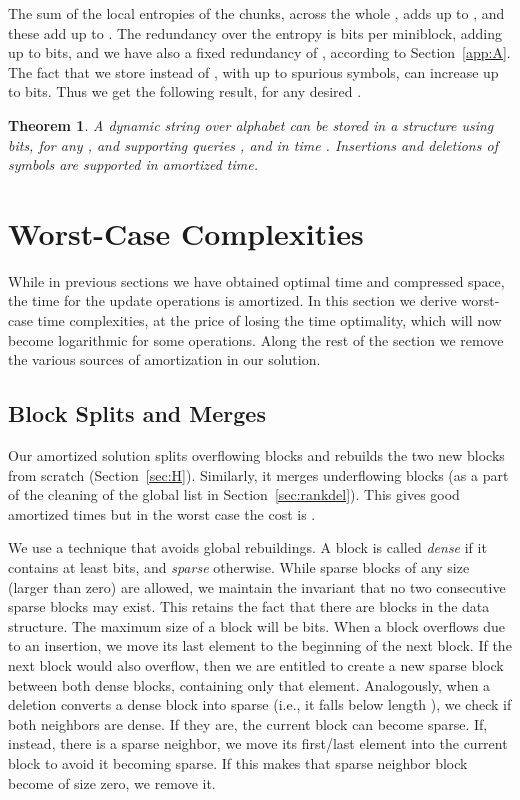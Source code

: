 \documentclass[11pt]{article}
\newtheorem{theorem}{Theorem}
\begin{document}
The sum of the local entropies of the chunks, across the whole 
, adds up to , and these add up to  \cite{GGV03}.
The redundancy over the entropy is  bits per
miniblock, adding up to  bits, and
we have also a fixed redundancy of , according to
Section~\ref{app:A}.
The fact that we store  instead of , with up to  spurious
symbols, can increase  up to  bits.
Thus we get the following result, for any desired .

\begin{theorem}
\label{thm:compr}
A dynamic string  over alphabet  
can be stored in a structure using 
 bits,
for any ,
and supporting queries
,  and  in time .
Insertions and deletions of symbols 
are supported in  amortized time. 
\end{theorem}

\section{Worst-Case Complexities} \label{sec:worst}

While in previous sections we have obtained optimal time and compressed space,
the time for the update operations is amortized. In this section we derive
worst-case time complexities, at the price of losing the time optimality,
which will now become logarithmic for some operations. 
Along the rest of the section we remove the various sources of amortization 
in our solution.

\subsection{Block Splits and Merges} \label{sec:indels}

Our amortized solution splits overflowing blocks and rebuilds the two new
blocks from scratch (Section~\ref{sec:H}). Similarly, it merges underflowing 
blocks (as a part of the cleaning of the global  list in 
Section~\ref{sec:rankdel}). This gives good amortized times but in the worst
case the cost is .

We use a technique \cite{GN09} that avoids global rebuildings. A block
is called {\em dense} if it contains at least  bits, and {\em
sparse} otherwise. While sparse blocks of any size (larger than zero) are 
allowed, we maintain the invariant that no two consecutive sparse blocks may 
exist. This retains the fact that there are  
blocks in the data structure. The maximum size of a block will be 
bits.
When a block overflows due to an insertion, we move its last element to the
beginning of the next block. If the next block would also overflow,
then we are entitled to create a new sparse block between both dense blocks, 
containing only that element. Analogously, when a deletion converts a dense
block into sparse (i.e., it falls below length ), we check if both
neighbors are dense. If they are, the current block can become sparse. If,
instead, there is a sparse neighbor, we move its first/last element
into the current block to avoid it becoming sparse. If this makes that sparse
neighbor block become of size zero, we remove it.
\end{document}
